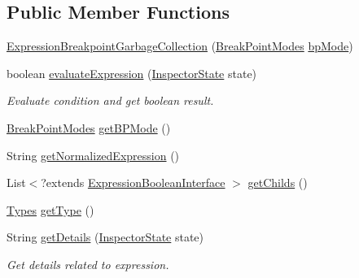 \subsection*{Public Member Functions}
\begin{DoxyCompactItemize}
\item 
\hyperlink{classgov_1_1nasa_1_1jpf_1_1inspector_1_1server_1_1expression_1_1expressions_1_1_expression_breakpoint_garbage_collection_a8ec79cd2dcfdb14e4800617eef876416}{Expression\+Breakpoint\+Garbage\+Collection} (\hyperlink{enumgov_1_1nasa_1_1jpf_1_1inspector_1_1server_1_1breakpoints_1_1_break_point_modes}{Break\+Point\+Modes} \hyperlink{classgov_1_1nasa_1_1jpf_1_1inspector_1_1server_1_1expression_1_1expressions_1_1_expression_breakpoint_garbage_collection_aa729f1c038654b0391ad1bb9d4d16cfc}{bp\+Mode})
\item 
boolean \hyperlink{classgov_1_1nasa_1_1jpf_1_1inspector_1_1server_1_1expression_1_1expressions_1_1_expression_breakpoint_garbage_collection_a481c3964677fe6412643edc5e2bd517a}{evaluate\+Expression} (\hyperlink{interfacegov_1_1nasa_1_1jpf_1_1inspector_1_1server_1_1expression_1_1_inspector_state}{Inspector\+State} state)
\begin{DoxyCompactList}\small\item\em Evaluate condition and get boolean result. \end{DoxyCompactList}\item 
\hyperlink{enumgov_1_1nasa_1_1jpf_1_1inspector_1_1server_1_1breakpoints_1_1_break_point_modes}{Break\+Point\+Modes} \hyperlink{classgov_1_1nasa_1_1jpf_1_1inspector_1_1server_1_1expression_1_1expressions_1_1_expression_breakpoint_garbage_collection_ac580d4b72f0db128201174bc08ebbadc}{get\+B\+P\+Mode} ()
\item 
String \hyperlink{classgov_1_1nasa_1_1jpf_1_1inspector_1_1server_1_1expression_1_1expressions_1_1_expression_breakpoint_garbage_collection_a26b3111a78d1306be39860a8cc97e02d}{get\+Normalized\+Expression} ()
\item 
List$<$?extends \hyperlink{interfacegov_1_1nasa_1_1jpf_1_1inspector_1_1server_1_1expression_1_1_expression_boolean_interface}{Expression\+Boolean\+Interface} $>$ \hyperlink{classgov_1_1nasa_1_1jpf_1_1inspector_1_1server_1_1expression_1_1_expression_boolean_leaf_aa99bf3cf13bd8cc1d6c33208bc83b185}{get\+Childs} ()
\item 
\hyperlink{enumgov_1_1nasa_1_1jpf_1_1inspector_1_1server_1_1expression_1_1_types}{Types} \hyperlink{classgov_1_1nasa_1_1jpf_1_1inspector_1_1server_1_1expression_1_1_expression_boolean_aed010ff8683eb1e8621e226703133457}{get\+Type} ()
\item 
String \hyperlink{classgov_1_1nasa_1_1jpf_1_1inspector_1_1server_1_1expression_1_1_expression_boolean_a43423e204404f24bf7862de938598eb7}{get\+Details} (\hyperlink{interfacegov_1_1nasa_1_1jpf_1_1inspector_1_1server_1_1expression_1_1_inspector_state}{Inspector\+State} state)
\begin{DoxyCompactList}\small\item\em Get details related to expression. \end{DoxyCompactList}\end{DoxyCompactItemize}
